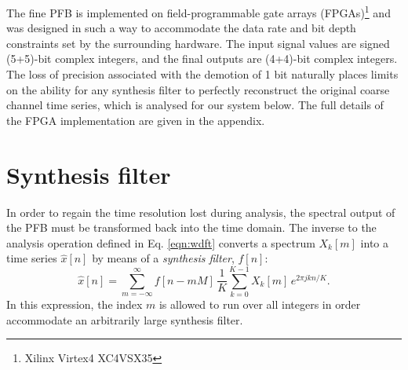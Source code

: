 \documentclass{pasa}%
\begin{document}
The fine PFB is implemented on field-programmable gate arrays (FPGAs)\footnote{Xilinx Virtex4 XC4VSX35} and was designed in such a way to accommodate the data rate and bit depth constraints set by the surrounding hardware.
The input signal values are signed (5+5)-bit complex integers, and the final outputs are (4+4)-bit complex integers.
The loss of precision associated with the demotion of 1 bit naturally places limits on the ability for any synthesis filter to perfectly reconstruct the original coarse channel time series, which is analysed for our system below.
The full details of the FPGA implementation are given in the appendix.

\section{Synthesis filter}
\label{sec:ipfb}

In order to regain the time resolution lost during analysis, the spectral output of the PFB must be transformed back into the time domain.
The inverse to the analysis operation defined in Eq. \eqref{eqn:wdft} converts a spectrum $X_k[m]$ into a time series $\hat{x}[n]$ by means of a \textit{synthesis filter}, $f[n]$:
\begin{equation}
    \hat{x}[n] = \sum_{m = -\infty}^{\infty} f[n - mM]\,
        \frac{1}{K} \sum_{k=0}^{K-1} X_k[m]\,e^{2\pi jkn/K}.
    \label{eqn:ipfb}
\end{equation}
In this expression, the index $m$ is allowed to run over all integers in order accommodate an arbitrarily large synthesis filter.
\end{document}
